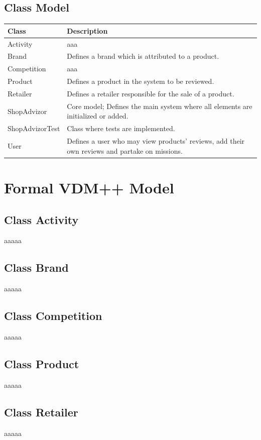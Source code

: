 \documentclass{article}
\begin{document}
\subsection{Class Model}
\begin{table}[h]
\begin{tabular}{|p{3cm}|p{8cm}|}
\hline
\textbf{Class} & \textbf{Description} \\
\hline
Activity           & aaa \\
\hline
Brand              & Defines a brand which is attributed to a product. \\
\hline
Competition        & aaa \\
\hline
Product            & Defines a product in the system to be reviewed. \\
\hline
Retailer           & Defines a retailer responsible for the sale of a product. \\
\hline
ShopAdvizor        & Core model; Defines the main system where all elements are initialized or added. \\
\hline
ShopAdvizorTest    & Class where tests are implemented. \\
\hline
User               & Defines a user who may view products' reviews, add their own reviews and partake on missions. \\
\hline
\end{tabular}
\end{table}

\section{Formal VDM++ Model}
\subsection{Class Activity}
aaaaa
\subsection{Class Brand}
aaaaa
\subsection{Class Competition}
aaaaa
\subsection{Class Product}
aaaaa
\subsection{Class Retailer}
aaaaa
\end{document}
